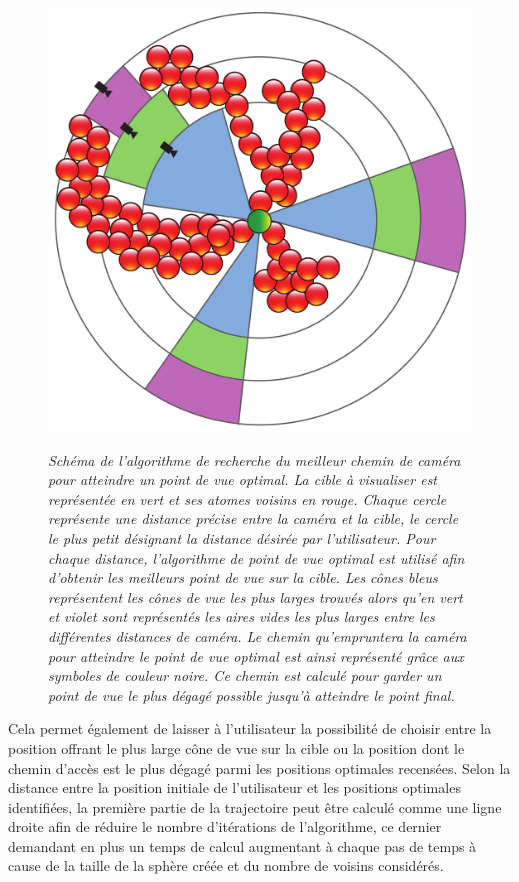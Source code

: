 \begin{figure}[h]
  \centering
  {\includegraphics[width=.5\linewidth]{./figures/ch3/optimal_pov_camera_path}}
    \caption[Schéma de l'algorithme de recherche du meilleur chemin de caméra pour atteindre un point de vue optimal.]{{\it Schéma de l'algorithme de recherche du meilleur chemin de caméra pour atteindre un point de vue optimal. La cible à visualiser est représentée en vert et ses atomes voisins en rouge. Chaque cercle représente une distance précise entre la caméra et la cible, le cercle le plus petit désignant la distance désirée par l'utilisateur. Pour chaque distance, l'algorithme de point de vue optimal est utilisé afin d'obtenir les meilleurs point de vue sur la cible. Les cônes bleus représentent les cônes de vue les plus larges trouvés alors qu'en vert et violet sont représentés les aires vides les plus larges entre les différentes distances de caméra. Le chemin qu'empruntera la caméra pour atteindre le point de vue optimal est ainsi représenté grâce aux symboles de couleur noire. Ce chemin est calculé pour garder un point de vue le plus dégagé possible jusqu'à atteindre le point final.}}
  \label{Fig:optimal_pov_camera_path}
  \hspace{0.2cm}
\end{figure}

Cela permet également de laisser à l'utilisateur la possibilité de choisir entre la position offrant le plus large cône de vue sur la cible ou la position dont le chemin d'accès est le plus dégagé parmi les positions optimales recensées. Selon la distance entre la position initiale de l'utilisateur et les positions optimales identifiées, la première partie de la trajectoire peut être calculé comme une ligne droite afin de réduire le nombre d'itérations de l'algorithme, ce dernier demandant en plus un temps de calcul augmentant à chaque pas de temps à cause de la taille de la sphère créée et du nombre de voisins considérés.

